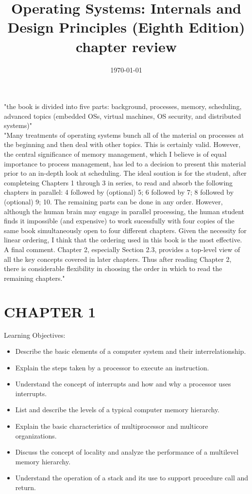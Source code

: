 \documentclass{article}
\title{Operating Systems: Internals and Design Principles (Eighth Edition) chapter review}
\date{\today}
\begin{document}
\maketitle

"the book is divided into five parts: background, processes, memory, scheduling, advanced topics (embedded OSs, virtual machines, OS security, and distributed systems)"\\

"Many treatments of operating systems bunch all of the material on processes at the beginning and then deal with other topics. This is certainly valid. However, the central significance of memory management, which I believe is of equal importance to process management, has led to a decision to present this material prior to an in-depth look at scheduling. The ideal soution is for the student, after completeing Chapters 1 through 3 in series, to read and absorb the following chapters in parallel: 4 followed by (optional) 5; 6 followed by 7; 8 followed by (optional) 9; 10. The remaining parts can be done in any order. However, although the human brain may engage in parallel processing, the human student finds it impossible (and expensive) to work sucessfully with four copies of the same book simultaneously open to four different chapters. Given the necessity for linear ordering, I think that the ordering used in this book is the most effective. A final comment. Chapter 2, especially Section 2.3, provides a top-level view of all the key concepts covered in later chapters. Thus after reading Chapter 2, there is considerable flexibility in choosing the order in which to read the remaining chapters."

\section*{CHAPTER 1}
	Learning Objectives:
	\begin{itemize}
		\item Describe the basic elements of a computer system and their interrelationship.
		\item Explain the steps taken by a processor to execute an instruction.
		\item Understand the concept of interrupts and how and why a processor uses interrupts.
		\item List and describe the levels of a typical computer memory hierarchy.
		\item Explain the basic characteristics of multiprocessor and multicore organizations.
		\item Discuss the concept of locality and analyze the performance of a multilevel memory hierarchy.
		\item Understand the operation of a stack and its use to support procedure call and return.
	\end{itemize}
\end{document}
